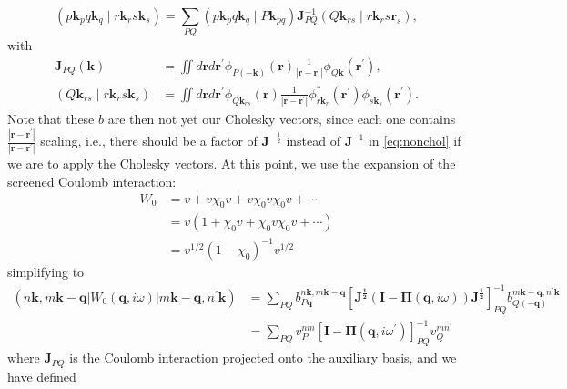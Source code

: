 \begin{equation*}
\left(p \mathbf{k}_{p} q \mathbf{k}_{q} \mid r \mathbf{k}_{r} s \mathbf{k}_{s}\right)=\sum_{P Q}\left(p \mathbf{k}_{p} q \mathbf{k}_{q} \mid P \mathbf{k}_{p q}\right) \mathbf{J}_{P Q}^{-1}\left(Q \mathbf{k}_{r s} \mid r \mathbf{k}_{r} s \mathbf{r}_{s}\right), 
\end{equation*}
with
\begin{align*}
\mathbf{J}_{P Q}(\mathbf{k}) & =\iint d \mathbf{r} d \mathbf{r}^{\prime} \phi_{P(-\mathbf{k})}(\mathbf{r}) \frac{1}{\left|\mathbf{r}-\mathbf{r}^{\prime}\right|} \phi_{Q \mathbf{k}}\left(\mathbf{r}^{\prime}\right),  \\
\left(Q \mathbf{k}_{r s} \mid r \mathbf{k}_{r} s \mathbf{k}_{s}\right) & =\iint d \mathbf{r} d \mathbf{r}^{\prime} \phi_{Q \mathbf{k}_{r s}}(\mathbf{r}) \frac{1}{\left|\mathbf{r}-\mathbf{r}^{\prime}\right|} \phi_{r \mathbf{k}_{r}}^{*}\left(\mathbf{r}^{\prime}\right) \phi_{s \mathbf{k}_{s}}\left(\mathbf{r}^{\prime}\right) . 
\end{align*}
Note that these $b$ are then not yet our Cholesky vectors, since each one contains $\frac{|\mathbf{r}-\mathbf{r}^{\prime}|}{|\mathbf{r}-\mathbf{r}^{\prime}|}$ scaling, i.e., there should be a factor of $\mathbf{J}^{-\frac{1}{2}}$  instead of $\mathbf{J}^{-1}$ in \ref{eq:nonchol} if we are to apply the Cholesky vectors.
At this point, we use the expansion of the screened Coulomb interaction:
\begin{align}
    W_0 &= v + v\chi_0 v + v\chi_0 v\chi_0 v + \cdots\\
    &= v(1 + \chi_0 v + \chi_0 v \chi_0 v + \cdots)\\
    &= v^{1/2} \left(1 - \chi_0\right)^{-1} v^{1/2}
\end{align}
simplifying to 
\begin{align}
    \left(n\mathbf{k}, m\mathbf{k}-\mathbf{q}\left|W_{0}(\mathbf{q}, i\omega )\right| m\mathbf{k}-\mathbf{q}, n^{\prime}\mathbf{k}\right) &= \sum_{PQ} b_{P\mathbf{q}}^{n\mathbf{k}, m\mathbf{k}-\mathbf{q}} \left[\mathbf{J^{\frac{1}{2}}}\left( \mathbf{I} - \boldsymbol{\Pi}(\mathbf{q}, i\omega ) \right) \mathbf{J^{\frac{1}{2}}}\right]^{-1}_{PQ} b_{Q(-\mathbf{q})}^{m\mathbf{k}-\mathbf{q}, n^{\prime}\mathbf{k}}\\
    &= \sum_{PQ} v_{P}^{n m}\left[\mathbf{I}-\mathbf{\Pi}\left(\mathbf{q}, i \omega^{\prime}\right)\right]_{P Q}^{-1} v_{Q}^{m n^{\prime}}
\end{align}
where $\mathbf{J}_{PQ}$ is the Coulomb interaction projected onto the auxiliary basis, and we have defined
